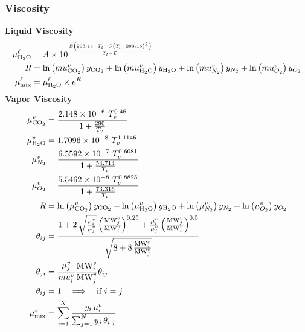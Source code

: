 \documentclass[a4paper,fleqn]{cas-sc}
\newcommand{\COtwo}{{\ce{CO2}}}
\newcommand{\HtwoO}{{\ce{H2O}}}
\newcommand{\liq}{\ell}
\newcommand{\vap}{v}
\begin{document}
    \subsubsection{Viscosity} \cite{Morgan2015}
    \textbf{Liquid Viscosity}
    \begin{align}
        \mu ^{\liq}_{\HtwoO} &= A \times 10^\frac{B\left(293.15 - T_l - C\left(T_l - 293.15\right)^2\right)}{T_l - D} \\
        R &= \ln\left(mu^{\vap}_{\COtwo}\right) y_{\COtwo}+\ln\left(mu^{\vap}_{\HtwoO}\right) y_{\HtwoO}+\ln\left(mu^{\vap}_{N_2}\right) y_{N_2}+\ln\left(mu^{\vap}_{O_2}\right) y_{O_2} \\
        \mu ^{\liq}_{\text{mix}} &= \mu ^{\liq}_{\HtwoO} \times e^{R}
    \end{align}
    \vspace{.5cm}
    \textbf{Vapor Viscosity}
    \begin{align}
        \mu ^{\vap}_{\COtwo} &= \frac{2.148 \times 10^{-6} \ T_v^{0.46}}{1+\frac{290}{T_v}} \\
        \mu ^{\vap}_{\HtwoO} &= 1.7096\times 10^{-8} \ T_v^{1.1146} \\
        \mu ^{\vap}_{N_2} &= \frac{6.5592\times 10^{-7} \ T_v^{0.6081}}{1+\frac{54.714}{T_v}} \\
        \mu ^{\vap}_{O_2} &= \frac{5.5462\times 10^{-8} \ T_v^{0.8825}}{1+\frac{73.316}{T_v}} \\
        R &= \ln\left(\mu^{\vap}_{\COtwo}\right) y_{\COtwo}+\ln\left(\mu^{\vap}_{\HtwoO}\right) y_{\HtwoO}+\ln\left(\mu^{\vap}_{N_2}\right) y_{N_2}+\ln\left(\mu^{\vap}_{O_2}\right) y_{O_2} \\
        \theta_{ij} &= \frac{1 + 2\,\sqrt{\frac{\mu^{\vap}_{i}}{\mu^{\vap}_{j}}}\left(\frac{\text{MW}^{\vap}_{j}}{\text{MW}^{\vap}_{i}}\right)^{0.25} + \frac{\mu^{\vap}_{i}}{\mu^{\vap}_{j}}\left(\frac{\text{MW}^{\vap}_{j}}{\text{MW}^{\vap}_{i}}\right)^{0.5}}{\sqrt{8 + 8\,\frac{\text{MW}^{\vap}_{i}}{\text{MW}^{\vap}_{j}}}} \\
        \theta_{ji} &= \frac{\mu ^{\vap}_{j}}{mu ^{\vap}_{i}}\frac{\text{MW}^{\vap}_{i}}{\text{MW}^{\vap}_{j}}\theta_{ij}  \\
        \theta_{ij} &= 1 \quad\Longrightarrow\quad \text{if } i = j \\
        \mu^{\vap}_{\text{mix}} &= \sum_{i=1}^{N} \frac{y_i \,\mu^{\vap}_{i}}{\sum_{j=1}^{N} y_j \,\theta_{i,j}}
    \end{align}
\end{document}
